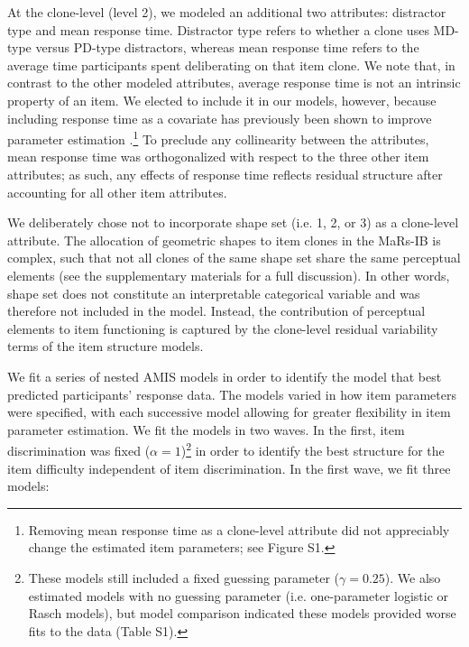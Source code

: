 \documentclass[a4paper,man,natbib,noextraspace]{apa6}
\begin{document}
At the clone-level (level 2), we modeled an additional two attributes: distractor type and mean response time. Distractor type refers to whether a clone uses MD-type versus PD-type distractors, whereas mean response time refers to the average time participants spent deliberating on that item clone. We note that, in contrast to the other modeled attributes, average response time is not an intrinsic property of an item. We elected to include it in our models, however, because including response time as a covariate has previously been shown to improve parameter estimation \citep{bertling2018using}.\footnote{Removing mean response time as a clone-level attribute did not appreciably change the estimated item parameters; see Figure S1.} To preclude any collinearity between the attributes, mean response time was orthogonalized with respect to the three other item attributes; as such, any effects of response time reflects residual structure after accounting for all other item attributes.

We deliberately chose not to incorporate shape set (i.e. 1, 2, or 3) as a clone-level attribute. The allocation of geometric shapes to item clones in the MaRs-IB is complex, such that not all clones of the same shape set share the same perceptual elements (see the supplementary materials for a full discussion). In other words, shape set does not constitute an interpretable categorical variable and was therefore not included in the model. Instead, the contribution of perceptual elements to item functioning is captured by the clone-level residual variability terms of the item structure models.

We fit a series of nested AMIS models in order to identify the model that best predicted participants' response data. The models varied in how item parameters were specified, with each successive model allowing for greater flexibility in item parameter estimation. We fit the models in two waves. In the first, item discrimination was fixed ($\alpha = 1$)\footnote{These models still included a fixed guessing parameter ($\gamma = 0.25$). We also estimated models with no guessing parameter (i.e. one-parameter logistic or Rasch models), but model comparison indicated these models provided worse fits to the data (Table S1).} in order to identify the best structure for the item difficulty independent of item discrimination. In the first wave, we fit three models:
\end{document}
